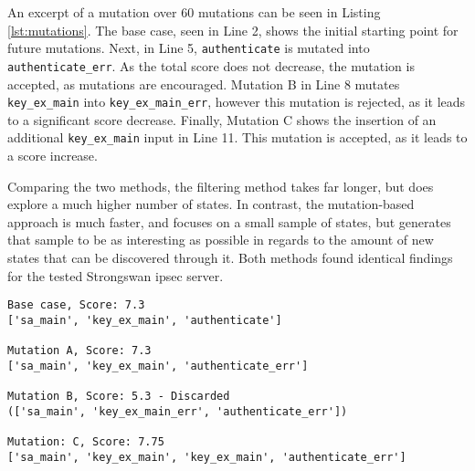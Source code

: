 An excerpt of a mutation over 60 mutations can be seen in Listing \ref{lst:mutations}. The base case, seen in Line 2, shows the initial starting point for future mutations. Next, in Line 5, \texttt{authenticate} is mutated into \texttt{authenticate\_err}. As the total score does not decrease, the mutation is accepted, as mutations are encouraged. Mutation B in Line 8 mutates \texttt{key\_ex\_main} into \texttt{key\_ex\_main\_err}, however this mutation is rejected, as it leads to a significant score decrease. Finally, Mutation C shows the insertion of an additional \texttt{key\_ex\_main} input in Line 11. This mutation is accepted, as it leads to a score increase.

Comparing the two methods, the filtering method takes far longer, but does explore a much higher number of states. In contrast, the mutation-based approach is much faster, and focuses on a small sample of states, but generates that sample to be as interesting as possible in regards to the amount of new states that can be discovered through it.
Both methods found identical findings for the tested Strongswan \ac{ipsec} server.


\begin{lstlisting}[float=h, caption=Mutations performed on abstract inputs, label=lst:mutations]
Base case, Score: 7.3
['sa_main', 'key_ex_main', 'authenticate']

Mutation A, Score: 7.3
['sa_main', 'key_ex_main', 'authenticate_err']

Mutation B, Score: 5.3 - Discarded 
(['sa_main', 'key_ex_main_err', 'authenticate_err'])

Mutation: C, Score: 7.75
['sa_main', 'key_ex_main', 'key_ex_main', 'authenticate_err']
\end{lstlisting}